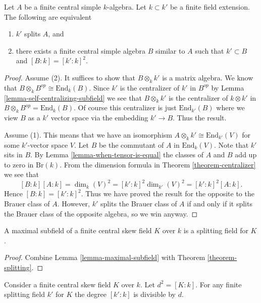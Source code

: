 \begin{theorem}
\label{theorem-splitting}
Let $A$ be a finite central simple $k$-algebra.
Let $k \subset k'$ be a finite field extension.
The following are equivalent
\begin{enumerate}
\item $k'$ splits $A$, and
\item there exists a finite central simple algebra $B$ similar to $A$
such that $k' \subset B$ and $[B : k] = [k' : k]^2$.
\end{enumerate}
\end{theorem}

\begin{proof}
Assume (2). It suffices to show that $B \otimes_k k'$ is a matrix
algebra. We know that $B \otimes_k B^{op} \cong \text{End}_k(B)$.
Since $k'$ is the centralizer of $k'$ in $B^{op}$ by
Lemma \ref{lemma-self-centralizing-subfield}
we see that $B \otimes_k k'$ is the centralizer of $k \otimes k'$
in $B \otimes_k B^{op} = \text{End}_k(B)$. Of course this centralizer
is just $\text{End}_{k'}(B)$ where we view $B$ as a $k'$ vector space
via the embedding $k' \to B$. Thus the result.

\medskip\noindent
Assume (1). This means that we have an isomorphism
$A \otimes_k k' \cong \text{End}_{k'}(V)$ for some $k'$-vector space $V$.
Let $B$ be the commutant of $A$ in $\text{End}_k(V)$. Note that
$k'$ sits in $B$. By
Lemma \ref{lemma-when-tensor-is-equal}
the classes of $A$ and $B$ add up to zero in $\text{Br}(k)$.
From the dimension formula in
Theorem \ref{theorem-centralizer}
we see that
$$
[B : k] [A : k] =
\dim_k(V)^2 =
[k' : k]^2 \dim_{k'}(V)^2 =
[k' : k]^2 [A : k].
$$
Hence $[B : k] = [k' : k]^2$. Thus we have proved the result for the
opposite to the Brauer class of $A$. However, $k'$ splits the Brauer
class of $A$ if and only if it splits
the Brauer class of the opposite algebra, so we win anyway.
\end{proof}

\begin{lemma}
\label{lemma-maximal-subfield-splits}
A maximal subfield of a finite central skew field $K$ over $k$ is
a splitting field for $K$.
\end{lemma}

\begin{proof}
Combine Lemma \ref{lemma-maximal-subfield} with
Theorem \ref{theorem-splitting}.
\end{proof}

\begin{lemma}
\label{lemma-splitting-field-degree}
Consider a finite central skew field $K$ over $k$. Let $d^2 = [K : k]$.
For any finite splitting field $k'$ for $K$ the degree $[k' : k]$ is
divisible by $d$.
\end{lemma}

